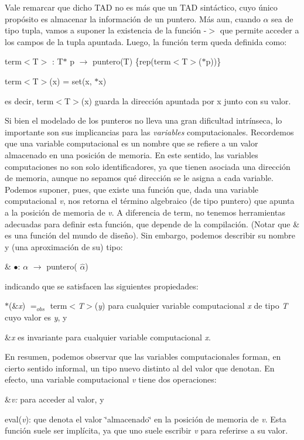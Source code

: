 Vale remarcar que dicho T\+AD no es más que un T\+AD sintáctico, cuyo único propósito es almacenar la información de un puntero. Más aun, cuando $\alpha$ sea de tipo tupla, vamos a suponer la existencia de la función -\/$>$ que permite acceder a los campos de la tupla apuntada. Luego, la función term queda definida como\+:
\begin{DoxyItemize}
\item term$<$\+T$>$ \+: T$\ast$ p $\to$ puntero(\+T) \{rep(term$<$\+T$>$($\ast$p))\}
\item term$<$\+T$>$(x) = set(x, $\ast$x)
\end{DoxyItemize}

es decir, term$<$\+T$>$(x) guarda la dirección apuntada por x junto con su valor.

Si bien el modelado de los punteros no lleva una gran dificultad intrínseca, lo importante son sus implicancias para las {\itshape variables} computacionales. Recordemos que una variable computacional es un nombre que se refiere a un valor almacenado en una posición de memoria. En este sentido, las variables computaciones no son solo identificadores, ya que tienen asociada una dirección de memoria, aunque no sepamos qué dirección se le asigna a cada variable. Podemos suponer, pues, que existe una función que, dada una variable computacional {\itshape v}, nos retorna el término algebraico (de tipo puntero) que apunta a la posición de memoria de {\itshape v}. A diferencia de term, no tenemos herramientas adecuadas para definir esta función, que depende de la compilación. (Notar que \& es una función del mundo de diseño). Sin embargo, podemos describir su nombre y (una aproximación de su) tipo\+:
\begin{DoxyItemize}
\item \& $\bullet$\+: $\alpha$ $\to$ puntero( $\widehat{\alpha}$)
\end{DoxyItemize}

indicando que se satisfacen las siguientes propiedades\+:
\begin{DoxyEnumerate}
\item $\ast$(\&{\itshape x}) $=_{obs}$ term$<${\itshape T$>$}({\itshape y}) para cualquier variable computacional {\itshape x} de tipo {\itshape T} cuyo valor es {\itshape y}, y
\item \&{\itshape x} es invariante para cualquier variable computacional {\itshape x}.
\end{DoxyEnumerate}

En resumen, podemos observar que las variables computacionales forman, en cierto sentido informal, un tipo nuevo distinto al del valor que denotan. En efecto, una variable computacional {\itshape v} tiene dos operaciones\+:
\begin{DoxyEnumerate}
\item \&{\itshape v\+:} para acceder al valor, y
\item eval({\itshape v})\+: que denota el valor \char`\"{}almacenado\char`\"{} en la posición de memoria de {\itshape v}. Esta función suele ser implícita, ya que uno suele escribir {\itshape v} para referirse a su valor.
\end{DoxyEnumerate}

